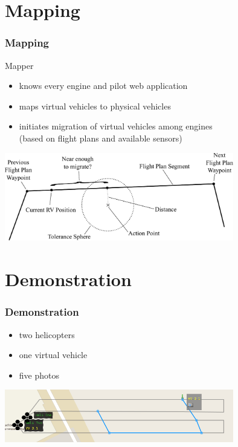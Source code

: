 \documentclass{beamer}
\begin{document}
\section{Mapping}
\begin{frame}\frametitle{Mapping} %
Mapper
\begin{itemize}
  \item knows every engine and pilot web application
  \item maps virtual vehicles to physical vehicles
  \item initiates migration of virtual vehicles among
  	engines \\ (based on flight plans and available sensors) 
\end{itemize}

\begin{center}
        {\includegraphics[width=10cm]{mapping.pdf}}
\end{center}
\end{frame}




\section{Demonstration}
\begin{frame}\frametitle{Demonstration} %
	\begin{itemize}
	  \item two helicopters
	  \item one virtual vehicle
	  \item five photos
	\end{itemize}
	\vspace{0.5cm}

	\begin{center}
	        {\includegraphics[width=10cm]{demo2-new.png}}
	\end{center}
\end{frame}
\end{document}
